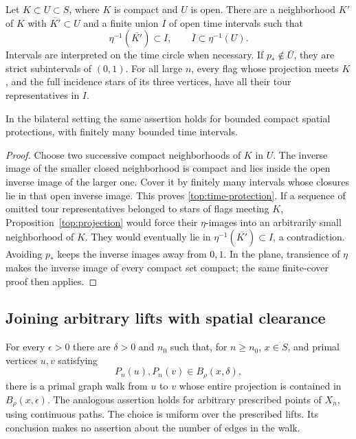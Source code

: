 \begin{lemma}
\label{top:protection}
Let $K\subset U\subset S$, where $K$ is compact and $U$ is open.
There are a neighborhood $K'$ of $K$ with $\overline{K'}\subset U$ and a
finite union $I$ of open time intervals such that
\begin{equation}\label{top:time-protection}
 \eta^{-1}(\overline{K'})\subset I,
 \qquad \overline I\subset\eta^{-1}(U).
\end{equation}
Intervals are interpreted on the time circle when necessary.  If
$p_*\notin\overline U$, they are strict subintervals of $(0,1)$.
For all large $n$, every flag whose projection meets $K$, and the full
incidence stars of its three vertices, have all their tour
representatives in $I$.

In the bilateral setting the same assertion holds for bounded compact
spatial protections, with finitely many bounded time intervals.
\end{lemma}

\begin{proof}
Choose two successive compact neighborhoods of $K$ in $U$.
The inverse image of the smaller closed neighborhood is compact and
lies inside the open inverse image of the larger one.  Cover it by
finitely many intervals whose closures lie in that open inverse image.
This proves \eqref{top:time-protection}.  If a sequence of omitted tour
representatives belonged to stars of flags meeting $K$,
Proposition~\ref{top:projection} would force their $\eta$-images into
an arbitrarily small neighborhood of $K$.  They would eventually lie
in $\eta^{-1}(\overline{K'})\subset I$, a contradiction.  Avoiding
$p_*$ keeps the inverse images away from $0,1$.
In the plane, transience of $\eta$ makes the inverse image of every
compact set compact; the same finite-cover proof then applies.
\end{proof}

\subsection{Joining arbitrary lifts with spatial clearance}

\begin{lemma}\label{top:local-joining}
For every $\epsilon>0$ there are $\delta>0$ and $n_0$ such that, for
$n\ge n_0$, $x\in S$, and primal vertices $u,v$ satisfying
\[
 P_n(u),P_n(v)\in B_\rho(x,\delta),
\]
there is a primal graph walk from $u$ to $v$ whose entire projection is
contained in $B_\rho(x,\epsilon)$.
The analogous assertion holds for arbitrary prescribed points of
$X_n$, using continuous paths.  The choice is uniform over the
prescribed lifts.  Its conclusion makes no assertion about the number
of edges in the walk.
\end{lemma}

